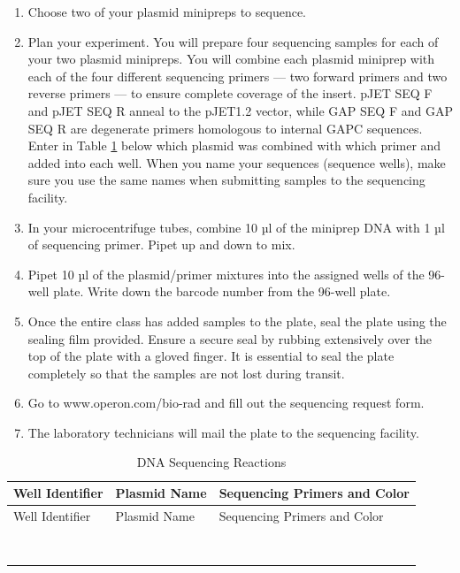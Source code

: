 \documentclass[]{book}
\providecommand{\tightlist}{%
  \setlength{\itemsep}{0pt}\setlength{\parskip}{0pt}}
\begin{document}
\begin{enumerate}
\def\labelenumi{\arabic{enumi}.}
\tightlist
\item
  Choose two of your plasmid minipreps to sequence.
\item
  Plan your experiment. You will prepare four sequencing samples for
  each of your two plasmid minipreps. You will combine each plasmid
  miniprep with each of the four different sequencing primers --- two
  forward primers and two reverse primers --- to ensure complete
  coverage of the insert. pJET SEQ F and pJET SEQ R anneal to the
  pJET1.2 vector, while GAP SEQ F and GAP SEQ R are degenerate primers
  homologous to internal GAPC sequences. Enter in Table \ref{tab:seq}
  below which plasmid was combined with which primer and added into each
  well. When you name your sequences (sequence wells), make sure you use
  the same names when submitting samples to the sequencing facility.
\item
  In your microcentrifuge tubes, combine 10 µl of the miniprep DNA with
  1 µl of sequencing primer. Pipet up and down to mix.
\item
  Pipet 10 µl of the plasmid/primer mixtures into the assigned wells of
  the 96-well plate. Write down the barcode number from the 96-well
  plate.
\item
  Once the entire class has added samples to the plate, seal the plate
  using the sealing film provided. Ensure a secure seal by rubbing
  extensively over the top of the plate with a gloved finger. It is
  essential to seal the plate completely so that the samples are not
  lost during transit.
\item
  Go to www.operon.com/bio-rad and fill out the sequencing request form.
\item
  The laboratory technicians will mail the plate to the sequencing
  facility.
\end{enumerate}

\begin{longtable}[]{@{}lll@{}}
\caption{\label{tab:seq} DNA Sequencing Reactions}\tabularnewline
\toprule
Well Identifier & Plasmid Name & Sequencing Primers and
Color\tabularnewline
\midrule
\endfirsthead
\toprule
Well Identifier & Plasmid Name & Sequencing Primers and
Color\tabularnewline
\midrule
\endhead
& &\tabularnewline
& &\tabularnewline
& &\tabularnewline
& &\tabularnewline
& &\tabularnewline
& &\tabularnewline
& &\tabularnewline
& &\tabularnewline
\bottomrule
\end{longtable}
\end{document}
